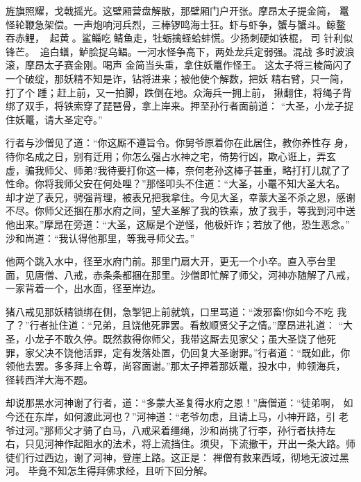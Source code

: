 旌旗照耀，戈戟摇光。这壁厢营盘解散，那壁厢门户开张。摩昂太子提金简，
鼍怪轮鞭急架偿。一声炮响河兵烈，三棒锣鸣海士狂。虾与虾争，蟹与蟹斗。鲸鳌
吞赤鲤，起黄。鲨鲻吃鲭鱼走，牡蛎擒蛏蛤蚌慌。少扬刺硬如铁棍，司
针利似锋芒。追白蟮，鲈脍捉乌鲳。一河水怪争高下，两处龙兵定弱强。混战
多时波浪滚，摩昂太子赛金刚。喝声
金简当头重，拿住妖鼍作怪王。
这太子将三棱简闪了一个破绽，那妖精不知是诈，钻将进来；被他使个解数，把妖
精右臂，只一简，打了个踵；赶上前，又一拍脚，跌倒在地。众海兵一拥上前，
揪翻住，将绳子背绑了双手，将铁索穿了琵琶骨，拿上岸来。押至孙行者面前道：
“大圣，小龙子捉住妖鼍，请大圣定夺。”

行者与沙僧见了道：“你这厮不遵旨令。你舅爷原着你在此居住，教你养性存
身，待你名成之日，别有迁用；你怎么强占水神之宅，倚势行凶，欺心诳上，弄玄
虚，骗我师父、师弟?我待要打你这一棒，奈何老孙这棒子甚重，略打打儿就了了
性命。你将我师父安在何处哩？”那怪叩头不住道：“大圣，小鼍不知大圣大名。
却才逆了表兄，骋强背理，被表兄把我拿住。今见大圣，幸蒙大圣不杀之恩，感谢
不尽。你师父还捆在那水府之间，望大圣解了我的铁索，放了我手，等我到河中送
他出来。”摩昂在旁道：“大圣，这厮是个逆怪，他极奸诈；若放了他，恐生恶念。”
沙和尚道：“我认得他那里，等我寻师父去。”

他两个跳入水中，径至水府门前。那里门扇大开，更无一个小卒。直入亭台里
面，见唐僧、八戒，赤条条都捆在那里。沙僧即忙解了师父，河神亦随解了八戒，
一家背着一个，出水面，径至岸边。

猪八戒见那妖精锁绑在侧，急掣钯上前就筑，口里骂道：“泼邪畜!你如今不吃
我了？”行者扯住道：“兄弟，且饶他死罪罢。看敖顺贤父子之情。”摩昂进礼道：
“大圣，小龙子不敢久停。既然救得你师父，我带这厮去见家父；虽大圣饶了他死
罪，家父决不饶他活罪，定有发落处置，仍回复大圣谢罪。”行者道：“既如此，你
领他去罢。多多拜上令尊，尚容面谢。”那太子押着那妖鼍，投水中，帅领海兵，
径转西洋大海不题。

却说那黑水河神谢了行者，道：“多蒙大圣复得水府之恩！”唐僧道：“徒弟啊，
如今还在东岸，如何渡此河也？”河神道：“老爷勿虑，且请上马，小神开路，引
老爷过河。”那师父才骑了白马，八戒采着缰绳，沙和尚挑了行李，孙行者扶持左
右，只见河神作起阻水的法术，将上流挡住。须臾，下流撤干，开出一条大路。师
徒们行过西边，谢了河神，登崖上路。这正是：
禅僧有救来西域，彻地无波过黑河。
毕竟不知怎生得拜佛求经，且听下回分解。